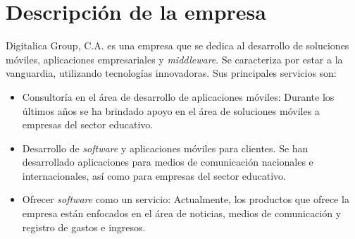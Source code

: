 \section{Descripción de la empresa} \label{Descripcion de la empresa}

Digitalica Group, C.A. es una empresa que se dedica al desarrollo de soluciones móviles, aplicaciones empresariales y \textit{middleware}. Se caracteriza por estar a la vanguardia, utilizando tecnologías innovadoras\cite{DIG1}. Sus principales servicios son:

\begin{itemize}
\item Consultoría en el área de desarrollo de aplicaciones móviles: Durante los últimos años se ha brindado apoyo en el área de soluciones móviles a empresas del sector educativo.
\item Desarrollo de \textit{software} y aplicaciones móviles para clientes. Se han desarrollado aplicaciones para medios de comunicación nacionales e internacionales, así como para empresas del sector educativo.
\item Ofrecer \textit{software} como un servicio: Actualmente, los productos que ofrece la empresa están enfocados en el área de noticias, medios de comunicación y registro de gastos e ingresos. 
\end{itemize}
